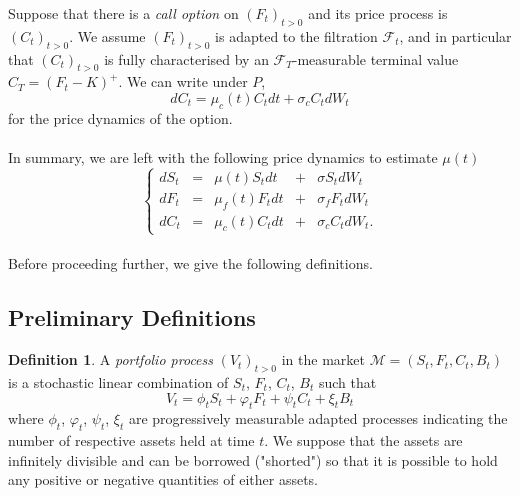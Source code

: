 \documentclass{article}
\theoremstyle{definition}
\newtheorem{definition}[thm]{Definition}
\theoremstyle{remark}
\newcommand{\filtration}[1]{\ensuremath{\mathscr{F}_{#1}}}
\newcommand{\market}{\ensuremath{\mathscr{M}}}
\newcommand{\process}[1]{\ensuremath{(#1_t)_{t>0}}}
\begin{document}
Suppose that there is a \emph{call option} on \process{F} and its price process is \process{C}. We assume \process{F} is adapted to the filtration \filtration{t}, and in particular that \process{C} is fully characterised by an \filtration{T}-measurable terminal value $C_T=(F_t-K)^+$. We can write under $P$, 
\begin{equation}
dC_t = \mu_c(t)C_t dt + \sigma_c C_t dW_t
\end{equation}
for the price dynamics of the option. \\
\\
In summary, we are left with the following price dynamics to estimate $\mu(t)$
\begin{equation}\label{eq:sys1}
\boxed{
\left\{ \begin{array}{lcrcr}
          dS_t & = & \mu(t)S_t dt & + & \sigma S_t dW_t \\ 
          dF_t & = & \mu_f(t) F_tdt & + & \sigma_f F_tdW_t \\ 
          dC_t & = & \mu_c(t)C_tdt & + & \sigma_c C_tdW_t.
        \end{array} \right. 
}
\end{equation}
\\
Before proceeding further, we give the following definitions.





\subsection{Preliminary Definitions}
\begin{definition}
A \textit{portfolio process} \process{V} in the market $\market =(S_t, F_t, C_t, B_t)$ is a stochastic linear combination of $S_t$, $F_t$, $C_t$, $B_t$ such that
\begin{equation}
V_t=\phi_tS_t+\varphi_t F_t + \psi_t C_t + \xi_t B_t
\end{equation}
where $\phi_t$, $\varphi_t$, $\psi_t$, $\xi_t$ are progressively measurable adapted processes indicating the number of respective assets held at time $t$. We suppose that the assets are infinitely divisible and can be borrowed ("shorted") so that it is possible to hold any positive or negative quantities of either assets.
\end{definition}
\end{document}
